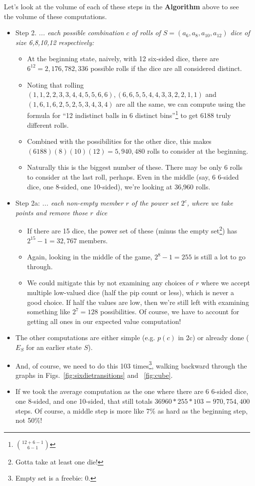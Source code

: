 \documentclass[11pt, oneside]{article} 	%
\begin{document}
Let's look at the volume of each of these steps in the \textbf{Algorithm} above to see the volume of these computations.
\begin{itemize}
\item Step 2. \emph{... each possible combination $c$ of rolls of $S = (a_6, a_8, a_{10}, a_{12})$ dice of size 6,8,10,12 respectively:}

  \begin{itemize}
  \item At the beginning state, naively, with 12 six-sided dice, there are $6^{12} = 2,176,782,336$ possible rolls if the dice are all considered distinct.
  \item Noting that rolling $(1,1,2,2,3,3,4,4,5,5,6,6), (6,6,5,5,4,4,3,3,2,2,1,1)$ and $(1,6,1,6,2,5,2,5,3,4,3,4) $ are all the same, we can compute using the formula for ``12 indistinct balls in 6 distinct bins''\footnote{${12 + 6 - 1 \choose 6 - 1}$} to get 6188 truly different rolls.
  \item Combined with the possibilities for the other dice, this makes $(6188)(8)(10)(12) = 5,940,480$ rolls to consider at the beginning. 
  \item Naturally this is the biggest number of these. There may be only 6 rolls to consider at the last roll, perhaps. Even in the middle (say, 6 6-sided dice, one 8-sided, one 10-sided), we're looking at 36,960 rolls.
  \end{itemize}
  
    
\item Step 2a: \emph{... each non-empty member $r$ of the power set $2^c$, where we take points and remove those $r$ dice}
  \begin{itemize}
  \item If there are 15 dice, the power set of these (minus the empty set\footnote{Gotta take at least one die!}) has $2^{15} - 1 = 32,767$ members.
  \item Again, looking in the middle of the game, $2^8 - 1 = 255$	 is still a lot to go through.
  \item We could mitigate this by not examining any choices  of $r$ where we accept multiple low-valued dice (half the pip count or less), which is never a good choice. If half the values are low, then we're still left with examining something like $2^7=128$ possibilities. Of course, we have to account for getting all ones in our expected value computation!
  \end{itemize}
\item The other computations are either simple (e.g. $p(c)$ in 2c) or already done ($E_S$ for an earlier state $S$).
\item And, of course, we need to do this 103 times\footnote{Empty set is a freebie: 0.}, walking backward through the graphs in Figs.~\ref{fig:sixdietransitions} and ~\ref{fig:cube}.
\item If we took the average computation as the one where there are 6 6-sided dice, one 8-sided, and one 10-sided, that still totals $36960*255*103 = 970,754,400$ steps. Of course, a middle step is more like 7\% as hard as the beginning step, not 50\%!
\end{itemize}
\end{document}
